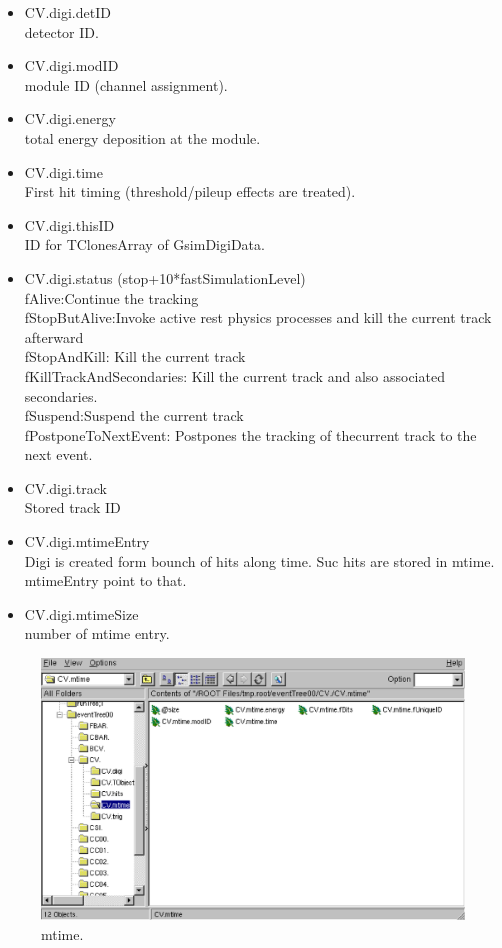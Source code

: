 \documentclass[a4paper,12pt]{article}
\begin{document}
    \begin{itemize}
     \item CV.digi.detID\\
	   detector ID. 
     \item CV.digi.modID\\
	   module ID (channel assignment).
     \item CV.digi.energy\\
	   total energy deposition at the module.
     \item CV.digi.time\\
	   First hit timing (threshold/pileup effects are treated).
     \item CV.digi.thisID\\
	   ID for TClonesArray of GsimDigiData.
     \item CV.digi.status (stop+10*fastSimulationLevel)\\
	   fAlive:Continue the tracking\\
	   fStopButAlive:Invoke active rest physics processes and kill the current track afterward\\
	   fStopAndKill: Kill the current track\\
	   fKillTrackAndSecondaries: Kill the current track and also
	   associated secondaries.\\
	   fSuspend:Suspend the current track\\
	   fPostponeToNextEvent: Postpones the tracking of thecurrent
	   track to the next event. 
     \item CV.digi.track\\
	   Stored track ID
     \item CV.digi.mtimeEntry\\
	   Digi is created form bounch of hits along time. Suc hits are
	   stored in mtime. mtimeEntry point to that.
     \item CV.digi.mtimeSize\\
	   number of mtime entry.
    \end{itemize}

    \begin{figure}[H]
     \begin{center}
      \includegraphics[scale=0.5]{xwd/mtime.eps}
     \end{center}
     \caption{mtime.}
    \end{figure}
\end{document}
